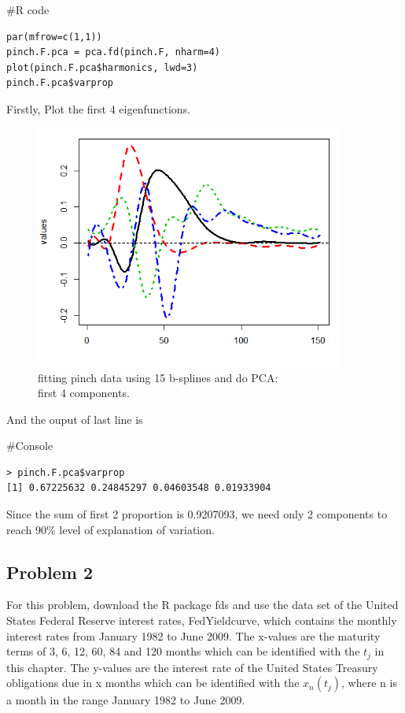 \documentclass{article}
\newenvironment{Rcode}%
{%
    \begin{mdframed}
    \#R code
    \begin{small}
}
{%
    \end{small}
    \end{mdframed}
}
\newenvironment{console}%
{%
    \begin{mdframed}
    \#Console
    \begin{small}
}
{%
    \end{small}
    \end{mdframed}
}
\begin{document}
\begin{Rcode}
    \begin{verbatim}
par(mfrow=c(1,1))
pinch.F.pca = pca.fd(pinch.F, nharm=4)
plot(pinch.F.pca$harmonics, lwd=3)
pinch.F.pca$varprop
    \end{verbatim}
\end{Rcode}

Firstly, Plot the first 4 eigenfunctions.

\begin{figure}[hh]
    \centering
    \includegraphics[height=8cm]{pinch_F_pca_4components_plot.png}
    \caption{fitting pinch data using 15 b-splines and do PCA: \\ first 4 components.}
\end{figure}

And the ouput of last line is

\begin{console}
    \begin{verbatim}
> pinch.F.pca$varprop
[1] 0.67225632 0.24845297 0.04603548 0.01933904
    \end{verbatim}
\end{console}

Since the sum of first 2 proportion is 0.9207093, we need only 2 components to reach 90\% level of explanation of variation.


\newpage
\subsection{Problem 2}

For this problem, download the R package fds and use the data set of the United States Federal Reserve interest rates, FedYieldcurve,
which contains the monthly interest rates from January 1982 to June 2009.
The x-values are the maturity terms of 3, 6, 12, 60, 84 and 120 months which can be identified with the $t_j$ in this chapter.
The y-values are the interest rate of the United States Treasury obligations due in x months which can be identified with the $x_n(t_j)$,
where n is a month in the range January 1982 to June 2009.
\end{document}
